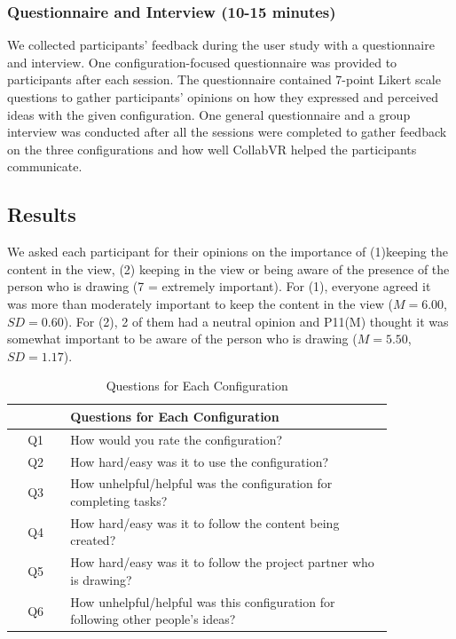 \documentclass[chi_draft]{sigchi}
\begin{document}
\subsubsection{Questionnaire and Interview (10-15 minutes)}
We collected participants' feedback during the user study with a questionnaire and interview. One configuration-focused questionnaire was provided to participants after each session. The questionnaire contained 7-point Likert scale questions to gather participants' opinions on how they expressed and perceived ideas with the given configuration. One general questionnaire and a group interview was conducted after all the sessions were completed to gather feedback on the three configurations and how well CollabVR helped the participants communicate.%

\subsection{Results}

We asked each participant for their opinions on the importance of (1)keeping the content in the view, (2) keeping in the view or being aware of the presence of the person who is drawing (7 = extremely important). For (1), everyone agreed it was more than moderately important to keep the content in the view ($M=6.00$, $SD=0.60$). For (2), 2 of them had a neutral opinion and P11(M) thought it was somewhat important to be aware of the person who is drawing ($M=5.50$, $SD=1.17$). 

\begin{table}
 \centering
 \begin{tabular}{c p{0.85\linewidth}}
    \toprule
    & Questions for Each Configuration\\
    \midrule
    Q1 & How would you rate the configuration?\\
    Q2 & How hard/easy was it to use the configuration?\\
    Q3 & How unhelpful/helpful was the configuration for completing tasks?\\
    Q4 & How hard/easy was it to follow the content being created?\\
    Q5 & How hard/easy was it to follow the project partner who is drawing?\\
    Q6 & How unhelpful/helpful was this configuration for following other people's ideas?\\
    \bottomrule
 \end{tabular}
 \caption{Questions for Each Configuration}~\label{tab:questions}
\end{table}
\end{document}
